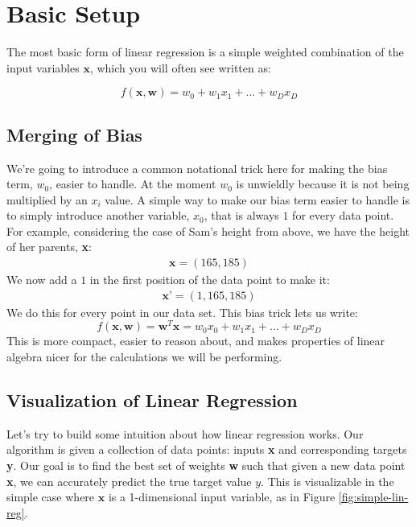\section{Basic Setup}
The most basic form of linear regression is a simple weighted combination of the input variables $\textbf{x}$, which you will often see written as:

\begin{equation}
    f(\textbf{x}, \textbf{w}) = w_{0} + w_{1}x_{1} + ... + w_{D}x_{D}
\end{equation}

\subsection{Merging of Bias}
We're going to introduce a common notational trick here for making the bias term, $w_{0}$, easier to handle. At the moment $w_{0}$ is unwieldly because it is not being multiplied by an $x_{i}$ value. A simple way to make our bias term easier to handle is to simply introduce another variable, $x_{0}$, that is always $1$ for every data point. For example, considering the case of Sam's height from above, we have the height of her parents, \textbf{x}:
\begin{align*}
    \textbf{x} = (165, 185)
\end{align*}
We now add a $1$ in the first position of the data point to make it:
\begin{align*}
    \textbf{x'} = (1, 165, 185)
\end{align*}
We do this for every point in our data set. This bias trick lets us write:
\begin{equation}
    f(\textbf{x}, \textbf{w}) = \textbf{w}^{T}\textbf{x} = w_{0}x_{0} + w_{1}x_{1} + ... + w_{D}x_{D}
\end{equation}
This is more compact, easier to reason about, and makes properties of linear algebra nicer for the calculations we will be performing.

\subsection{Visualization of Linear Regression}
Let's try to build some intuition about how linear regression works. Our algorithm is given a collection of data points: inputs \textbf{x} and corresponding targets \textbf{y}. Our goal is to find the best set of weights \textbf{w} such that given a new data point \textbf{x}, we can accurately predict the true target value $y$. This is visualizable in the simple case where $\textbf{x}$ is a 1-dimensional input variable, as in Figure \ref{fig:simple-lin-reg}.

